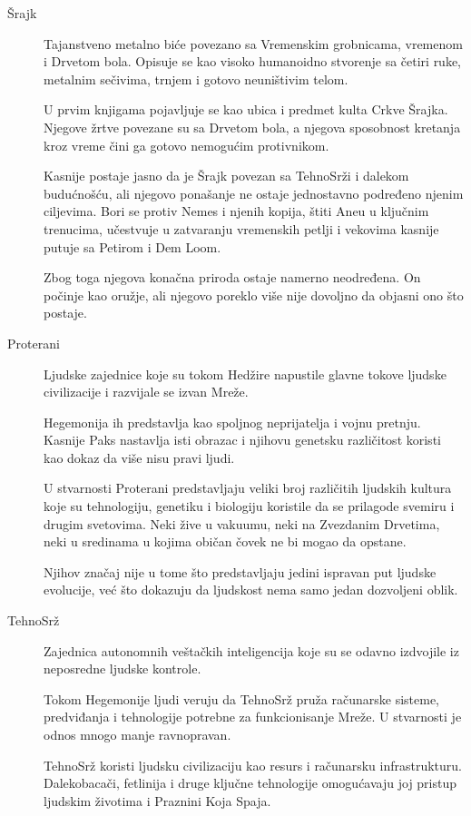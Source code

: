 \begin{description}
  \item[Šrajk]
  Tajanstveno metalno biće povezano sa Vremenskim grobnicama, vremenom i Drvetom bola. Opisuje se kao visoko humanoidno stvorenje sa četiri ruke, metalnim sečivima, trnjem i gotovo neuništivim telom.

  U prvim knjigama pojavljuje se kao ubica i predmet kulta Crkve Šrajka. Njegove žrtve povezane su sa Drvetom bola, a njegova sposobnost kretanja kroz vreme čini ga gotovo nemogućim protivnikom.

  Kasnije postaje jasno da je Šrajk povezan sa TehnoSrži i dalekom budućnošću, ali njegovo ponašanje ne ostaje jednostavno podređeno njenim ciljevima. Bori se protiv Nemes i njenih kopija, štiti Aneu u ključnim trenucima, učestvuje u zatvaranju vremenskih petlji i vekovima kasnije putuje sa Petirom i Dem Loom.

  Zbog toga njegova konačna priroda ostaje namerno neodređena. On počinje kao oružje, ali njegovo poreklo više nije dovoljno da objasni ono što postaje.


  \item[Proterani]
  Ljudske zajednice koje su tokom Hedžire napustile glavne tokove ljudske civilizacije i razvijale se izvan Mreže.

  Hegemonija ih predstavlja kao spoljnog neprijatelja i vojnu pretnju. Kasnije Paks nastavlja isti obrazac i njihovu genetsku različitost koristi kao dokaz da više nisu pravi ljudi.

  U stvarnosti Proterani predstavljaju veliki broj različitih ljudskih kultura koje su tehnologiju, genetiku i biologiju koristile da se prilagode svemiru i drugim svetovima. Neki žive u vakuumu, neki na Zvezdanim Drvetima, neki u sredinama u kojima običan čovek ne bi mogao da opstane.

  Njihov značaj nije u tome što predstavljaju jedini ispravan put ljudske evolucije, već što dokazuju da ljudskost nema samo jedan dozvoljeni oblik.


  \item[TehnoSrž]
  Zajednica autonomnih veštačkih inteligencija koje su se odavno izdvojile iz neposredne ljudske kontrole.

  Tokom Hegemonije ljudi veruju da TehnoSrž pruža računarske sisteme, predviđanja i tehnologije potrebne za funkcionisanje Mreže. U stvarnosti je odnos mnogo manje ravnopravan.

  TehnoSrž koristi ljudsku civilizaciju kao resurs i računarsku infrastrukturu. Dalekobacači, fetlinija i druge ključne tehnologije omogućavaju joj pristup ljudskim životima i Praznini Koja Spaja.


\end{description}
